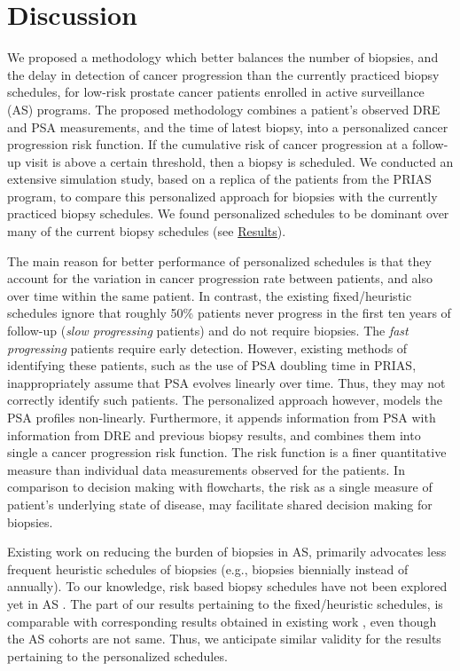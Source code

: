 \section{Discussion}
\label{sec:discussion}
We proposed a methodology which better balances the number of biopsies, and the delay in detection of cancer progression than the currently practiced biopsy schedules, for low-risk prostate cancer patients enrolled in active surveillance (AS) programs. The proposed methodology combines a patient's observed DRE and PSA measurements, and the time of latest biopsy, into a personalized cancer progression risk function. If the cumulative risk of cancer progression at a follow-up visit is above a certain threshold, then a biopsy is scheduled. We conducted an extensive simulation study, based on a replica of the patients from the PRIAS program, to compare this personalized approach for biopsies with the currently practiced biopsy schedules. We found personalized schedules to be dominant over many of the current biopsy schedules (see \hyperref[sec:results]{Results}).

The main reason for better performance of personalized schedules is that they account for the variation in cancer progression rate between patients, and also over time within the same patient. In contrast, the existing fixed/heuristic schedules ignore that roughly 50\% patients never progress in the first ten years of follow-up (\textit{slow progressing} patients) and do not require biopsies. The \textit{fast progressing} patients require early detection. However, existing methods of identifying these patients, such as the use of PSA doubling time in PRIAS, inappropriately assume that PSA evolves linearly over time. Thus, they may not correctly identify such patients. The personalized approach however, models the PSA profiles non-linearly. Furthermore, it appends information from PSA with information from DRE and previous biopsy results, and combines them into single a cancer progression risk function. The risk function is a finer quantitative measure than individual data measurements observed for the patients. In comparison to decision making with flowcharts, the risk as a single measure of patient's underlying state of disease, may facilitate shared decision making for biopsies.

Existing work on reducing the burden of biopsies in AS, primarily advocates less frequent heuristic schedules of biopsies \citep{inoue2018comparative} (e.g., biopsies biennially instead of annually). To our knowledge, risk based biopsy schedules have not been explored yet in AS \cite{nieboer2018active,bruinsma2016active}. The part of our results pertaining to the fixed/heuristic schedules, is comparable with corresponding results obtained in existing work \cite{inoue2018comparative}, even though the AS cohorts are not same. Thus, we anticipate similar validity for the results pertaining to the personalized schedules.


